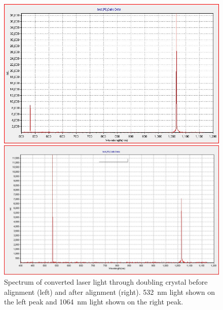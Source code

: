 \begin{figure}[h!]
  \centering
  \begin{minipage}{.45\textwidth}
	  \includegraphics[scale = .32]{Images/doublingCrystalWright2017.JPG}
  \end{minipage}
  \begin{minipage}{.45\textwidth}
	  \includegraphics[scale = .25]{Images/goodspectrum.JPG}
  \end{minipage}
  \caption{Spectrum of converted laser light through doubling crystal before alignment (left) and after alignment (right). \SI{532}{\nano \meter} light shown on the left peak and \SI{1064}{\nano \meter} light shown on the right peak.}
  \label{fig:conversionspectrum1}
\end{figure}

